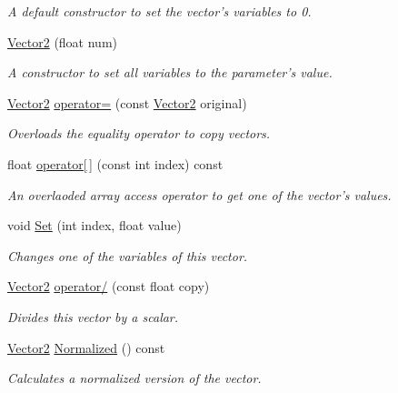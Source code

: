 \begin{CompactItemize}
\begin{CompactList}\small\item\em A default constructor to set the vector's variables to 0. \item\end{CompactList}\item 
\hyperlink{struct_vector2_bd2746f75192b018c15831940d080b38}{Vector2} (float num)
\begin{CompactList}\small\item\em A constructor to set all variables to the parameter's value. \item\end{CompactList}\item 
\hyperlink{struct_vector2}{Vector2} \hyperlink{struct_vector2_3d1d26225e42356584a90f6c61e86b17}{operator=} (const \hyperlink{struct_vector2}{Vector2} original)
\begin{CompactList}\small\item\em Overloads the equality operator to copy vectors. \item\end{CompactList}\item 
float \hyperlink{struct_vector2_ef2c82543da2c72118f7d145333f1d05}{operator\mbox{[}$\,$\mbox{]}} (const int index) const 
\begin{CompactList}\small\item\em An overlaoded array access operator to get one of the vector's values. \item\end{CompactList}\item 
void \hyperlink{struct_vector2_b2eed8d8249024d0edeb809178da3972}{Set} (int index, float value)
\begin{CompactList}\small\item\em Changes one of the variables of this vector. \item\end{CompactList}\item 
\hyperlink{struct_vector2}{Vector2} \hyperlink{struct_vector2_4a047a7b72a15bc98eeb90f84bec1069}{operator/} (const float copy)
\begin{CompactList}\small\item\em Divides this vector by a scalar. \item\end{CompactList}\item 
\hyperlink{struct_vector2}{Vector2} \hyperlink{struct_vector2_34d1ee65e90865a7078dbc7e80e3c7e8}{Normalized} () const 
\begin{CompactList}\small\item\em Calculates a normalized version of the vector. \item\end{CompactList}\end{CompactItemize}
